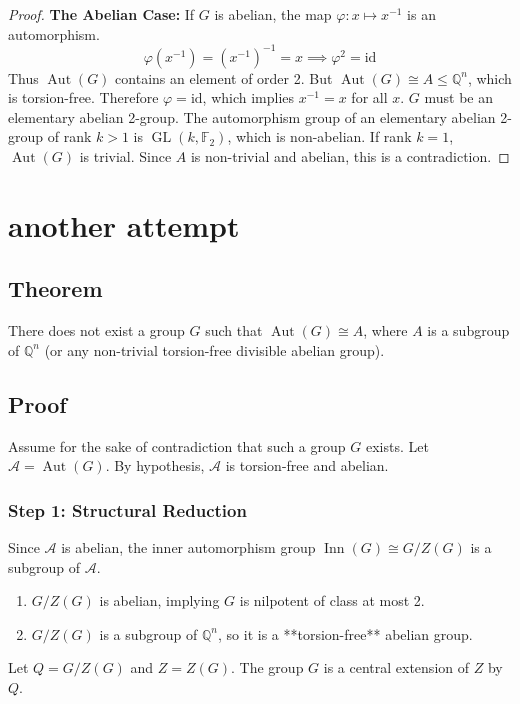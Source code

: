 \documentclass{book}
\let\temp\phi
\let\phi\varphi
\let\varphi\temp
\begin{document}
\begin{proof}
\textbf{The Abelian Case:}
If $G$ is abelian, the map $\phi: x \mapsto x^{-1}$ is an automorphism.
\[ \phi(x^{-1}) = (x^{-1})^{-1} = x \implies \phi^2 = \text{id} \]
Thus $\operatorname{Aut}(G)$ contains an element of order 2.
But $\operatorname{Aut}(G) \cong A \le \mathbb{Q}^n$, which is torsion-free.
Therefore $\phi = \text{id}$, which implies $x^{-1} = x$ for all $x$.
$G$ must be an elementary abelian 2-group.
The automorphism group of an elementary abelian 2-group of rank $k > 1$ is $\operatorname{GL}(k, \mathbb{F}_2)$, which is non-abelian. If rank $k=1$, $\operatorname{Aut}(G)$ is trivial.
Since $A$ is non-trivial and abelian, this is a contradiction.

\end{proof}

\chapter{another attempt}


\section{Theorem}
There does not exist a group $G$ such that $\operatorname{Aut}(G) \cong A$, where $A$ is a subgroup of $\mathbb{Q}^n$ (or any non-trivial torsion-free divisible abelian group).

\section{Proof}

Assume for the sake of contradiction that such a group $G$ exists. Let $\mathcal{A} = \operatorname{Aut}(G)$. By hypothesis, $\mathcal{A}$ is torsion-free and abelian.

\subsection*{Step 1: Structural Reduction}
Since $\mathcal{A}$ is abelian, the inner automorphism group $\operatorname{Inn}(G) \cong G/Z(G)$ is a subgroup of $\mathcal{A}$.
\begin{enumerate}
    \item $G/Z(G)$ is abelian, implying $G$ is nilpotent of class at most 2.
    \item $G/Z(G)$ is a subgroup of $\mathbb{Q}^n$, so it is a **torsion-free** abelian group.
\end{enumerate}
Let $Q = G/Z(G)$ and $Z = Z(G)$. The group $G$ is a central extension of $Z$ by $Q$.
\end{document}
